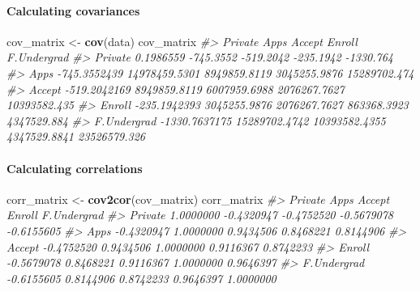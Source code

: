 \documentclass[]{article}
\newenvironment{Shaded}{\begin{snugshade}}{\end{snugshade}}
\newcommand{\CommentTok}[1]{\textcolor[rgb]{0.56,0.35,0.01}{\textit{#1}}}
\newcommand{\KeywordTok}[1]{\textcolor[rgb]{0.13,0.29,0.53}{\textbf{#1}}}
\newcommand{\NormalTok}[1]{#1}
\newcommand{\OperatorTok}[1]{\textcolor[rgb]{0.81,0.36,0.00}{\textbf{#1}}}
\newcommand{\StringTok}[1]{\textcolor[rgb]{0.31,0.60,0.02}{#1}}
\let\oldparagraph\paragraph
\renewcommand{\paragraph}[1]{\oldparagraph{#1}\mbox{}}
\begin{document}
\begin{Shaded}
\end{Shaded}

\hypertarget{calculating-covariances}{%
\paragraph{Calculating covariances}\label{calculating-covariances}}

\begin{Shaded}
\begin{Highlighting}[]
\NormalTok{cov_matrix <-}\StringTok{ }\KeywordTok{cov}\NormalTok{(data)}
\NormalTok{cov_matrix}
\CommentTok{#>                   Private          Apps        Accept       Enroll  F.Undergrad}
\CommentTok{#> Private         0.1986559     -745.3552     -519.2042    -235.1942    -1330.764}
\CommentTok{#> Apps         -745.3552439 14978459.5301  8949859.8119 3045255.9876 15289702.474}
\CommentTok{#> Accept       -519.2042169  8949859.8119  6007959.6988 2076267.7627 10393582.435}
\CommentTok{#> Enroll       -235.1942393  3045255.9876  2076267.7627  863368.3923  4347529.884}
\CommentTok{#> F.Undergrad -1330.7637175 15289702.4742 10393582.4355 4347529.8841 23526579.326}
\end{Highlighting}
\end{Shaded}

\newpage

\hypertarget{calculating-correlations}{%
\paragraph{Calculating correlations}\label{calculating-correlations}}

\begin{Shaded}
\begin{Highlighting}[]
\NormalTok{corr_matrix <-}\StringTok{ }\KeywordTok{cov2cor}\NormalTok{(cov_matrix)}
\NormalTok{corr_matrix}
\CommentTok{#>                Private       Apps     Accept     Enroll F.Undergrad}
\CommentTok{#> Private      1.0000000 -0.4320947 -0.4752520 -0.5679078  -0.6155605}
\CommentTok{#> Apps        -0.4320947  1.0000000  0.9434506  0.8468221   0.8144906}
\CommentTok{#> Accept      -0.4752520  0.9434506  1.0000000  0.9116367   0.8742233}
\CommentTok{#> Enroll      -0.5679078  0.8468221  0.9116367  1.0000000   0.9646397}
\CommentTok{#> F.Undergrad -0.6155605  0.8144906  0.8742233  0.9646397   1.0000000}
\end{Highlighting}
\end{Shaded}
\end{document}
